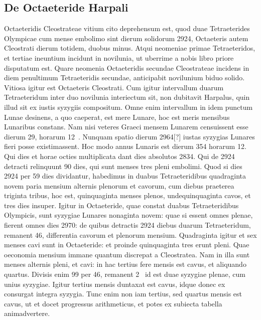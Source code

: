 \subsection{De Octaeteride Harpali}

Octaeteridis Cleostrateae vitium cito deprehensum est,
quod duae Tetraeterides Olympicae cum mense embolimo sint
dierum solidorum 2924, Octaeteris autem Cleostrati dierum
totidem, duobus minus.
Atqui neomeniae primae Tetraeteridos, et tertiae
ineuntium incidunt in novilunia, ut uberrime a nobis libro priore
disputatum est.
Quare neomenia Octaeteridis secundae Cleostrateae
incidens in diem penultimum Tetraeteridis secundae, anticipabit novilunium
biduo solido.
Vitiosa igitur est Octaeteris Cleostrati.
Cum
igitur intervallum duarum Tetraeteridum inter duo novilunia interiectum
sit, non dubitavit Harpalus, quin illud sit ex iustis syzygiis compositum.
Omne enim intervallum in idem punctum Lunae desinens,
a quo caeperat, est mere Lunare, hoc est meris mensibus Lunaribus
constans.
Nam nisi veteres Graeci mensem Lunarem censuissent esse
dierum 29, horarum 12~.
Nunquam spatio dierum 2964[?] iustas syzygias
Lunares fieri posse existimassent.
Hoc modo annus Lunaris est
dierum 354 horarum 12.
Qui dies et horae octies multiplicata dant dies
absolutos 2834.
Qui de 2924 detracti relinquunt 90 dies, qui sunt
menses tres pleni embolimi.
Quod si dies 2924 per 59 dies dividantur,
habedimus in duabus Tetraeteridibus quadraginta novem paria
mensium alternis plenorum et cavorum, cum diebus praeterea triginta
tribus, hoc est, quinquaginta menses plenos, undequinquaginta
cavos, et tres dies insuper.
Igitur in Octaeteride, quae constat duabus
Tetraeteridibus Olympicis, sunt syzygiae Lunares nonaginta
novem: quae si essent omnes plenae, fierent omnes dies 2970: de quibus
detractis 2924 diebus duarum Tetraeteridum, remanent 46, differentia
cavorum et plenorum mensium.
Quadraginta igitur et sex
menses cavi sunt in Octaeteride: et proinde quinquaginta tres erunt
pleni.
Quae oeconomia mensium immane quantum discrepat a Cleostratea.
Nam in illa sunt menses alternis pleni, et cavi: in hac tertius
fere mensis est cavus, et aliquando quartus.
Divisis enim 99 per
46, remanent 2~ id est duae syzygiae plenae,
 cum  unius syzygiae.
Igitur tertius mensis duntaxat est cavus, idque donec ex
  consurgat
integra syzygia.
Tunc enim non iam tertius, sed quartus mensis est cavus,
ut et docet progressus arithmeticus, et potes ex subiecta tabella
animadvertere.

